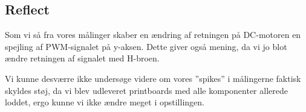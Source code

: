 \documentclass[../main.tex]{subfiles}
\begin{document}
\subsection{Reflect}    
Som vi så fra vores målinger skaber en ændring af retningen på DC-motoren en spejling af PWM-signalet på y-aksen. Dette giver også mening, da vi jo blot ændre retningen af signalet med H-broen.

Vi kunne desværre ikke undersøge videre om vores ”spikes” i målingerne faktisk skyldes støj, da vi blev udleveret printboards med alle komponenter allerede loddet, ergo kunne vi ikke ændre meget i opstillingen. 
\end{document}
